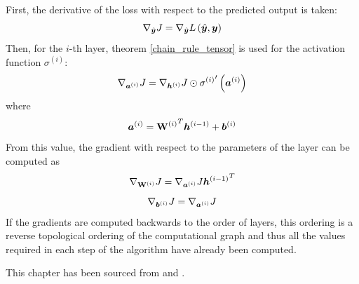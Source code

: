 \begin{example}
First, the derivative of the loss with respect to the predicted output is taken:
\[ \nabla_{\hat{\bm{y} }} J = \nabla_{\hat{\bm{y}}} L \left( \hat{\bm{y}}, \bm{y} \right) \]
Then, for the \( i \)-th layer, theorem \ref{chain_rule_tensor} is used for the activation function \( \sigma^{(i)} \):
\[ \nabla_{\bm{a}^{(i)}} J = \nabla_{\bm{h}^{(i)}} J \odot {\sigma^{(i)}}' \left( \bm{a}^{(i)} \right) \]
where 
\[ \bm{a}^{(i)} = {\mathbf{W}^{(i)}}^T \bm h^{(i - 1)} + \bm{b}^{(i)} \]
From this value, the gradient with respect to the parameters of the layer can be computed as
\[ \nabla_{\mathbf{W}^{(i)}} J = \nabla_{\bm{a}^{(i)}} J {\bm{h}^{(i - 1)}}^T \]
\[ \nabla_{\bm{b}^{(i)}} J = \nabla_{\bm{a}^{(i)}} J \]
If the gradients are computed backwards to the order of layers, this ordering is a reverse topological ordering of the computational graph and thus all the values required in each step of the algorithm have already been computed.

This chapter has been sourced from \cite{goodfellow_deep_2016} and \cite{olah_calculus_2015}.
\end{example}
